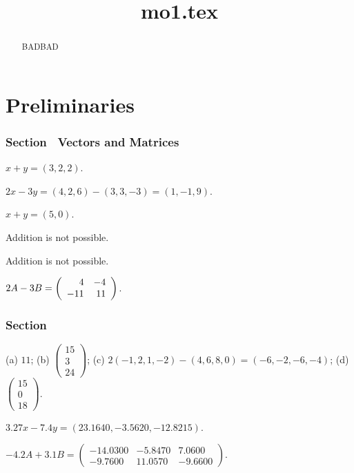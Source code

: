 \documentclass{ximera}
\title{mo1.tex}
\begin{document}
\begin{abstract}
BADBAD
\end{abstract}
\maketitle

\setcounter{chapter}{0}

\chapter{Preliminaries}

\subsection*{Section~\protect{\ref{S:1.1}} Vectors and Matrices}

 $ x + y = (3,2,2)$.

 $2x - 3y = (4,2,6) - (3,3,-3) = (1,-1,9)$.

 $x + y = (5,0)$.

 Addition is not possible.

 Addition is not possible.

 $2A - 3B = \left(\begin{array}{rr} 4 & -4\\ -11 &11\end{array}\right)$.



\subsection*{Section~\protect{\ref{S:1.2}} \protect{\Matlab}}

(a) $11$;
(b) $\left(\begin{array}{r} 15\\ 3 \\24\end{array} \right)$;
(c) $2(-1,2, 1,-2)- (4, 6, 8, 0)=(-6,-2,-6,-4)$;
(d) $\left(\begin{array}{r} 15 \\ 0 \\ 18 \end{array} \right)$.

  $3.27x - 7.4y = (23.1640, -3.5620, -12.8215)$.

  $-4.2A + 3.1B = \left(\begin{array}{rrr} 
-14.0300 & -5.8470 &    7.0600 \\
 -9.7600 & 11.0570 &   -9.6600\end{array}\right)$.
\end{document}
